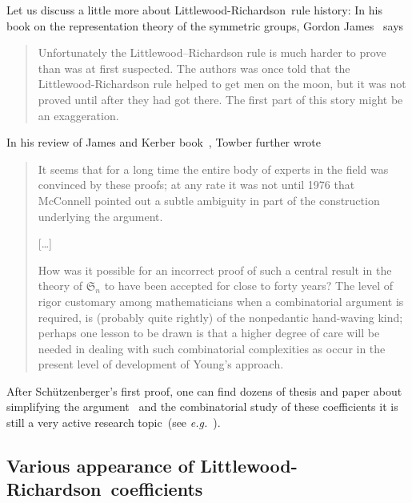 \documentclass[12pt]{article}
\newcommand{\LR}{Littlewood-Richardson\ }
\newcommand{\SG}{{\mathfrak S}}
\newcommand{\eg}{\textit{e.g.}\xspace}
\begin{document}
Let us discuss a little more about \LR rule history: In his book on the
representation theory of the symmetric groups, Gordon James~\cite{James84}
says
\begin{quotation}
  Unfortunately the Littlewood–Richardson rule is much harder to prove than
  was at first suspected. The authors was once told that the
  Littlewood-Richardson rule helped to get men on the moon, but it was not
  proved until after they had got there. The first part of this story might be
  an exaggeration.
\end{quotation}
In his review of James and Kerber book~\cite{Towber83}, Towber further wrote
\begin{quotation}
  It seems that for a long time the entire body of experts in the field was
  convinced by these proofs; at any rate it was not until 1976 that McConnell
  pointed out a subtle ambiguity in part of the construction underlying the
  argument.

  [\dots]

  How was it possible for an incorrect proof of such a central result in the
  theory of $\SG_n$ to have been accepted for close to forty years? The level
  of rigor customary among mathematicians when a combinatorial argument is
  required, is (probably quite rightly) of the nonpedantic hand-waving kind;
  perhaps one lesson to be drawn is that a higher degree of care will be
  needed in dealing with such combinatorial complexities as occur in the
  present level of development of Young's approach.
\end{quotation}


After Schützenberger's first proof, one can find dozens of thesis and
paper about simplifying the argument~\cite{Zelevinsky81,Macdonald95,Gasharov98,NCFS6,VanLeeuwen01,Stembridge02}
and the combinatorial study of these coefficients it is still a very active
research topic~(see \eg~\cite{qAnalogs,LLT,KingToumazetTollu,KnutsonTao99}).


\subsection{Various appearance of \LR coefficients}
\end{document}
